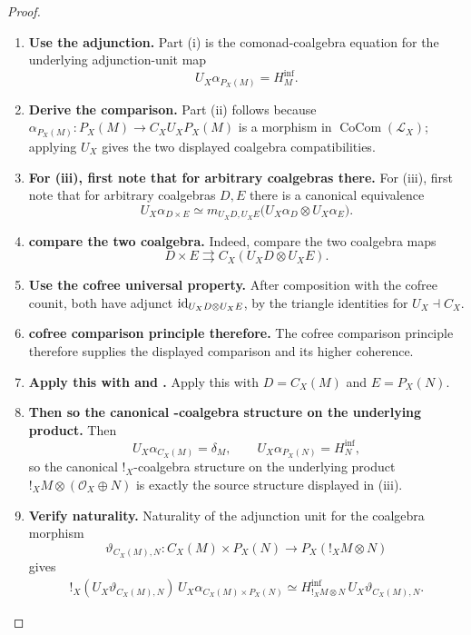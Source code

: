 \begin{proof}
\leavevmode
\begin{enumerate}[label=\textup{(\arabic*)}]
    \item \textbf{Use the adjunction.}
    Part \textup{(i)} is the comonad-coalgebra equation for the underlying adjunction-unit map
    \[
        U_X\alpha_{P_X(M)}=H^{\inf}_M.
    \]

    \item \textbf{Derive the comparison.}
    Part \textup{(ii)} follows because \(\alpha_{P_X(M)}:P_X(M)\to C_XU_XP_X(M)\) is a morphism in \(\operatorname{CoCom}(\mathcal L_X)\); applying
    \(U_X\) gives the two displayed coalgebra compatibilities.

    \item \textbf{For (iii), first note that for arbitrary coalgebras there.}
    For \textup{(iii)}, first note that for arbitrary coalgebras \(D,E\) there is a
    canonical equivalence
    \[
        U_X\alpha_{D\times E}
        \simeq
        m_{U_XD,U_XE}
        \bigl(U_X\alpha_D\otimes U_X\alpha_E\bigr).
    \]

    \item \textbf{compare the two coalgebra.}
    Indeed, compare the two coalgebra maps
    \[
        D\times E\rightrightarrows C_X(U_XD\otimes U_XE).
    \]

    \item \textbf{Use the cofree universal property.}
    After composition with the cofree counit, both have adjunct \(\operatorname{id}_{U_XD\otimes U_XE}\), by the triangle
    identities for \(U_X\dashv C_X\).

    \item \textbf{cofree comparison principle therefore.}
    The cofree comparison principle therefore supplies the displayed comparison and its higher
    coherence.

    \item \textbf{Apply this with and .}
    Apply this with \(D=C_X(M)\) and \(E=P_X(N)\).

    \item \textbf{Then so the canonical -coalgebra structure on the underlying product.}
    Then
    \[
        U_X\alpha_{C_X(M)}=\delta_M,
        \qquad
        U_X\alpha_{P_X(N)}=H^{\inf}_N,
    \]
    so the canonical \(!_X\)-coalgebra structure on the underlying product \(!_XM\otimes(\mathcal O_X\oplus N)\) is
    exactly the source structure displayed in \textup{(iii)}.

    \item \textbf{Verify naturality.}
    Naturality of the adjunction unit for the coalgebra morphism
    \[
        \vartheta_{C_X(M),N}:
        C_X(M)\times P_X(N)
        \longrightarrow
        P_X(!_XM\otimes N)
    \]
    gives
    \[
    \begin{aligned}
        !_X(U_X\vartheta_{C_X(M),N})\,
        U_X\alpha_{C_X(M)\times P_X(N)}
        \simeq
        H^{\inf}_{!_XM\otimes N}\,
        U_X\vartheta_{C_X(M),N}.
    \end{aligned}
    \]


\end{enumerate}
\end{proof}
